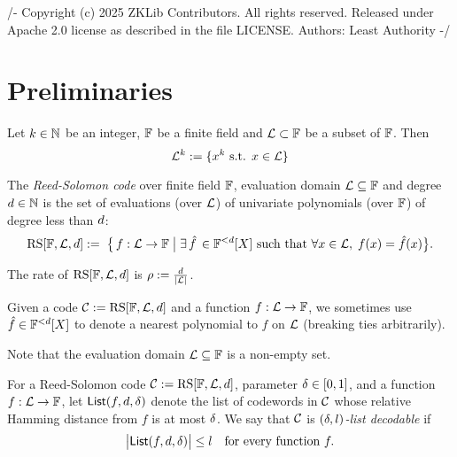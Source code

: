 /-
Copyright (c) 2025 ZKLib Contributors. All rights reserved.
Released under Apache 2.0 license as described in the file LICENSE.
Authors: Least Authority
-/

\chapter{Preliminaries}


\begin{definition}
    Let $k\in \mathbb{N}$ be an integer, $\mathbb{F}$ be a finite field and $\mathcal{L} \subset \mathbb{F}$ be a subset of $\mathbb{F}$. Then 
    \[
    \mathcal{L}^k := \{x^k \text{ s.t. } x \in \mathcal{L}\}
    \]   
\end{definition}

\begin{definition}\label{def:rscode}
\leanok
    The \emph{Reed-Solomon code} over finite field $\mathbb{F}$, evaluation domain $\mathcal{L}\subseteq\mathbb{F}$ and degree $d\in\mathbb{N}$ is the set of evaluations (over $\mathcal{L}$) of univariate polynomials (over $\mathbb{F}$) of degree less than $d$:
    \[
        \mathrm{RS}[\mathbb{F},\mathcal{L},d]:=\; \bigl\{\, f : \mathcal{L} \to \mathbb{F} \;\big|\; \exists \,\hat{f} \,\in \mathbb{F}^{<d}[X]\text{ such that } \forall x \in \mathcal{L},\; f(x) = \hat{f}(x)\bigr\}.
    \]

    The rate of $\mathrm{RS}[\mathbb{F},\mathcal{L},d]$ is $\rho := \frac{d}{\lvert \mathcal{L} \rvert}$.

    Given a code $\mathcal{C} := \mathrm{RS}[\mathbb{F},\mathcal{L},d]$ and a function $f : \mathcal{L} \to \mathbb{F}$, we sometimes use $\hat{f} \in \mathbb{F}^{<d}[X]$ to denote a nearest polynomial to $f$ on $\mathcal{L}$ (breaking ties arbitrarily).
\end{definition}

\begin{remark}
Note that the evaluation domain $\mathcal{L}\subseteq\mathbb{F}$ is a non-empty set.
\end{remark}

\begin{definition}\label{def:list_decodable}
{}
    For a Reed-Solomon code $\mathcal{C} := \mathrm{RS}[\mathbb{F},\mathcal{L},d]$, parameter $\delta \in [0,1]$, 
    and a function $f:\mathcal{L}\to\mathbb{F}$, let $\mathsf{List}(f,d,\delta)$ denote the list 
    of codewords in $\mathcal{C}$ whose relative Hamming distance from $f$ is at most $\delta$.
    We say that $\mathcal{C}$ is \emph{$(\delta,l)$-list decodable} if 
    \[
    \bigl|\mathsf{List}(f,d,\delta)\bigr| \leq l
    \quad
    \text{for every function } f.
    \]
\end{definition}
    
